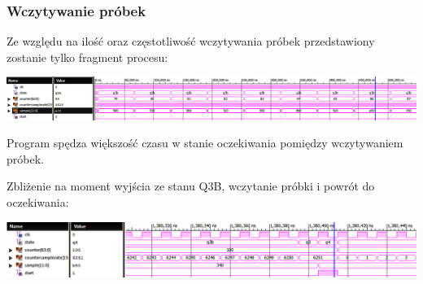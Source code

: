 \documentclass{article}
\begin{document}
\subsubsection{Wczytywanie próbek}
\par Ze względu na ilość oraz częstotliwość wczytywania próbek przedstawiony zostanie tylko fragment procesu:
\begin{center}
	\includegraphics[scale=0.52, center]{photo/d_sound_1.png}
\end{center}
\par Program spędza większość czasu w stanie oczekiwania pomiędzy wczytywaniem próbek. 
\par Zbliżenie na moment wyjścia ze stanu Q3B, wczytanie próbki i powrót do oczekiwania:
\begin{center}
	\includegraphics[scale=0.65, center]{photo/d_sound_2.png}
\end{center}
\newpage
\end{document}
